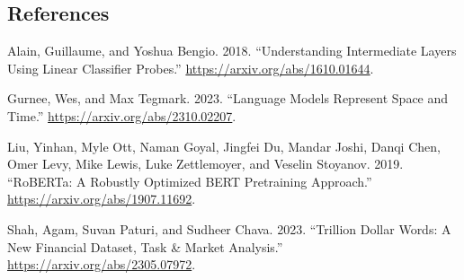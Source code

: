 \documentclass[
  letterpaper,
  DIV=11,
  numbers=noendperiod]{scrartcl}
\newlength{\cslhangindent}
\newenvironment{CSLReferences}[2] %
 {\begin{list}{}{%
  \setlength{\itemindent}{0pt}
  \setlength{\leftmargin}{0pt}
  \setlength{\parsep}{0pt}
  \ifodd #1
   \setlength{\leftmargin}{\cslhangindent}
   \setlength{\itemindent}{-1\cslhangindent}
  \fi
  \setlength{\itemsep}{#2\baselineskip}}}
 {\end{list}}
\theoremstyle{plain}
\theoremstyle{remark}
\begin{document}
\subsection*{References}\label{references}

\label{refs}
\begin{CSLReferences}{1}{0}
Alain, Guillaume, and Yoshua Bengio. 2018. {``Understanding Intermediate
Layers Using Linear Classifier Probes.''}
\url{https://arxiv.org/abs/1610.01644}.

Gurnee, Wes, and Max Tegmark. 2023. {``Language Models Represent Space
and Time.''} \url{https://arxiv.org/abs/2310.02207}.

Liu, Yinhan, Myle Ott, Naman Goyal, Jingfei Du, Mandar Joshi, Danqi
Chen, Omer Levy, Mike Lewis, Luke Zettlemoyer, and Veselin Stoyanov.
2019. {``RoBERTa: A Robustly Optimized BERT Pretraining Approach.''}
\url{https://arxiv.org/abs/1907.11692}.

Shah, Agam, Suvan Paturi, and Sudheer Chava. 2023. {``Trillion Dollar
Words: A New Financial Dataset, Task \& Market Analysis.''}
\url{https://arxiv.org/abs/2305.07972}.

\end{CSLReferences}
\end{document}
